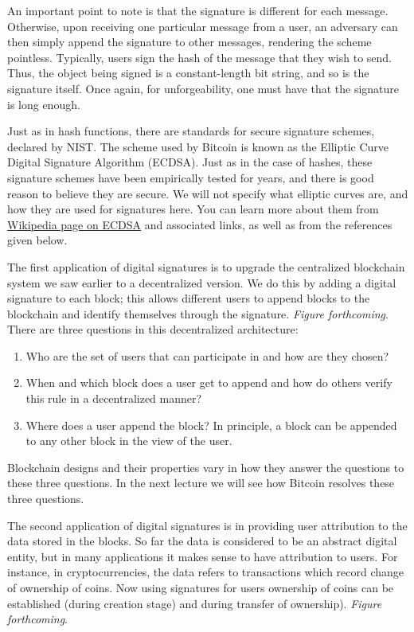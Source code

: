 \documentclass{article}
\begin{document}
An important point to note is that the signature is different for each message. Otherwise, upon receiving one particular message from a user, an adversary can then simply append the signature to other messages, rendering the scheme pointless. Typically, users sign the hash of the message that they wish to send. Thus, the object being signed is a constant-length bit string, and so is the signature itself. Once again, for unforgeability, one must have that the signature is long enough.

Just as in hash functions, there are standards for secure signature schemes, declared by NIST. The scheme used by Bitcoin is known as the Elliptic Curve Digital Signature Algorithm (ECDSA). Just as in the case of hashes, these signature schemes have been empirically tested for years, and there is good reason to believe they are secure. We will not specify what elliptic curves are, and how they are used for signatures here. You can learn more about them from \href{https://en.wikipedia.org/wiki/Elliptic_Curve_Digital_Signature_Algorithm}{Wikipedia page on ECDSA} and associated links, as well as from the references given below.

The first application of digital signatures is to upgrade the centralized blockchain system we saw earlier to a decentralized version. We do this by adding a digital signature to each block; this allows different users to append blocks to the blockchain and identify themselves through the signature. \textit{Figure forthcoming}. There are three questions in this decentralized architecture: 
\begin{enumerate}
    \item Who are the set of users that can participate in and how are they chosen? 
    \item When and which block does a user get to append and how do others verify this rule in a decentralized manner?
    \item Where does a user append the block? In principle, a block can be appended to any other block in the view of the user. 
\end{enumerate}
Blockchain designs and their properties vary in how they answer the questions to these three questions. In the next lecture we will see how Bitcoin resolves these three questions. 

The second application of digital signatures is in providing user attribution to the data stored in the blocks. So far the data is considered to be an abstract digital entity, but in many applications it makes sense to have attribution to users. For instance, in  cryptocurrencies, the data refers to transactions which record change of ownership of coins. Now using signatures for users ownership of coins can be established (during creation stage) and during transfer of ownership).  \textit{Figure forthcoming}.
\end{document}
